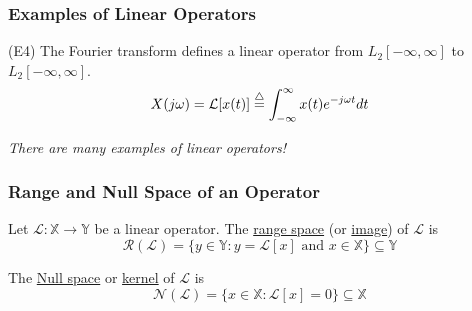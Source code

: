 \documentclass{beamer}
\begin{document}
\begin{frame}\frametitle{Examples of Linear Operators}
\begin{example}
\noindent (E4) The Fourier transform defines a linear operator from $L_2[-\infty,\infty]$ to $L_2[-\infty,\infty]$.\\
\[ X(j\omega) = \mathcal{L}[x(t)] \stackrel{\triangle}{=} \int_{-\infty}^{\infty} x(t)e^{-j\omega t}dt \]	
\end{example}

\vspace{1cm}
{\em There are many examples of linear operators!}
\end{frame}

\begin{frame}\frametitle{Range and Null Space of an Operator}
\begin{definition}
	Let $\mathcal{L}: \mathbb{X} \to \mathbb{Y}$ be a
linear operator.  The \underline{range space} (or \underline{image}) of $\mathcal{L}$ is 
\[
\mathcal{R}(\mathcal{L}) = \{ y \in \mathbb{Y} : y = \mathcal{L}[x] \text{ and } x \in \mathbb{X}\} \subseteq \mathbb{Y}
\]
\end{definition}
\begin{definition}
The \underline{Null space} or \underline{kernel} of $\mathcal{L}$ is
\[
\mathcal{N}(\mathcal{L}) = \{ x \in \mathbb{X} : \mathcal{L}[x] = 0 \} \subseteq \mathbb{X} 
\]	
\end{definition}
	
\end{frame}
\end{document}
